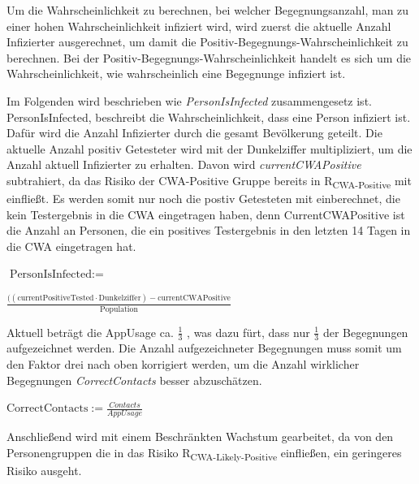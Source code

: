\documentclass[conference,compsoc]{IEEEtran}
\begin{document}
\centerline{\text{ }}



\text{\}}

\centerline{\text{ }}

Um die Wahrscheinlichkeit zu berechnen, bei welcher Begegnungsanzahl, man zu einer hohen Wahrscheinlichkeit infiziert wird,
wird zuerst die aktuelle Anzahl Infizierter ausgerechnet, um damit die Positiv-Begegnungs-Wahrscheinlichkeit zu berechnen.
Bei der Positiv-Begegnungs-Wahrscheinlichkeit handelt es sich um die Wahrscheinlichkeit, wie wahrscheinlich eine Begegnunge infiziert ist.

Im Folgenden wird beschrieben wie \textit{PersonIsInfected} zusammengesetz ist.
PersonIsInfected, beschreibt die Wahrscheinlichkeit, dass eine Person infiziert ist. Dafür wird die Anzahl Infizierter durch die gesamt Bevölkerung geteilt.
Die aktuelle Anzahl positiv Getesteter wird mit der Dunkelziffer multipliziert, um die Anzahl aktuell Infizierter zu erhalten. 
Davon wird \textit{currentCWAPositive} subtrahiert, da das Risiko der CWA-Positive Gruppe bereits in R\textsubscript{CWA-Positive} mit einfließt. 
Es werden somit nur noch die postiv Getesteten mit einberechnet, die kein Testergebnis in die CWA eingetragen haben, denn
CurrentCWAPositive ist die Anzahl an Personen, die ein positives Testergebnis in den letzten 14 Tagen in die CWA eingetragen hat.

\centerline{\text{ }}
\centerline{$\text{PersonIsInfected} :=$}
\centerline{$\frac{((\text{currentPositiveTested} \cdot \text{Dunkelziffer}) - \text{currentCWAPositive}}{\text{Population}}$}
\centerline{\text{ }}

Aktuell beträgt die AppUsage ca. $\frac{1}{3}$ \cite{Downloads}, was dazu fürt, dass nur $\frac{1}{3}$ der Begegnungen aufgezeichnet werden.
Die Anzahl aufgezeichneter Begegnungen muss somit um den Faktor drei nach oben korrigiert werden, 
um die Anzahl wirklicher Begegnungen \textit{CorrectContacts} besser abzuschätzen. 

\centerline{\text{ }}
\centerline{$\text{CorrectContacts} := \frac{Contacts}{AppUsage}$}
\centerline{\text{ }}

Anschließend wird mit einem Beschränkten Wachstum gearbeitet, da von den Personengruppen die in das Risiko R\textsubscript{CWA-Likely-Positive} einfließen, 
ein geringeres Risiko ausgeht.
\end{document}
